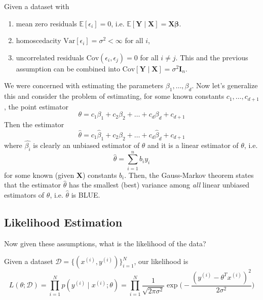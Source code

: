   \begin{theorem}
    Given a dataset with 
    \begin{enumerate}
      \item mean zero residuals $\mathbb{E}[\epsilon_i] = 0$, i.e. $\mathbb{E}[\mathbf{Y} \mid \mathbf{X}] = \mathbf{X} \boldsymbol{\beta}$. 
      \item homoscedacity $\mathrm{Var}[\epsilon_i] = \sigma^2 < \infty$ for all $i$, 
      \item uncorrelated residuals $\mathrm{Cov}(\epsilon_i, \epsilon_j) = 0$ for all $i \neq j$. This and the previous assumption can be combined into $\mathrm{Cov}[\mathbf{Y} \mid \mathbf{X}] = \sigma^2 \mathbf{I}_n$. 
    \end{enumerate}
    We were concerned with estimating the parameters $\beta_1, \ldots, \beta_d$. Now let's generalize this and consider the problem of estimating, for some known constants $c_1, \ldots, c_{d+1}$, the point estimator 
    \begin{equation}
      \theta = c_1 \beta_1 + c_2 \beta_2 + \ldots + c_d \beta_d + c_{d+1}
    \end{equation}
    Then the estimator 
    \begin{equation}
      \hat{\theta} = c_1 \hat{\beta}_1 + c_2 \hat{\beta}_2 + \ldots + c_d \hat{\beta}_d + c_{d+1}
    \end{equation}
    where $\hat{\beta_i}$ is clearly an unbiased estimator of $\theta$ and it is a linear estimator of $\theta$, i.e. 
    \begin{equation}
      \hat{\theta} = \sum_{i=1}^n b_i y_i
    \end{equation}
    for some known (given $\mathbf{X}$) constants $b_i$. Then, the Gauss-Markov theorem states that the estimator $\hat{\theta}$ has the smallest (best) variance among \textit{all} linear unbiased estimators of $\theta$, i.e. $\hat{\theta}$ is BLUE. 
  \end{theorem}

\subsection{Likelihood Estimation}

  Now given these assumptions, what is the likelihood of the data? 

  \begin{lemma}[Likelihood]
    Given a dataset $\mathcal{D} = \{(x^{(i)}, y^{(i)})\}_{i=1}^N$, our likelihood is 
    \[L(\theta ; \mathcal{D}) = \prod_{i=1}^N p(y^{(i)} \mid x^{(i)}; \theta) = \prod_{i=1}^N \frac{1}{\sqrt{2 \pi \sigma^2}} \exp \bigg( -\frac{(y^{(i)} - \theta^T x^{(i)})^2}{2 \sigma^2} \bigg)\]
  \end{lemma} 

